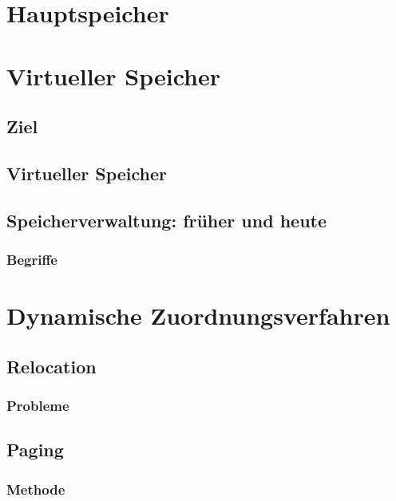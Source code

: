 \section*{Hauptspeicher}
\section{Virtueller Speicher}
\subsection{Ziel}
\subsection{Virtueller Speicher}
\subsection{Speicherverwaltung: früher und heute}
\subsubsection{Begriffe}

\section{Dynamische Zuordnungsverfahren}
\subsection{Relocation}
\subsubsection{Probleme}
\subsection{Paging}
\subsubsection{Methode}
